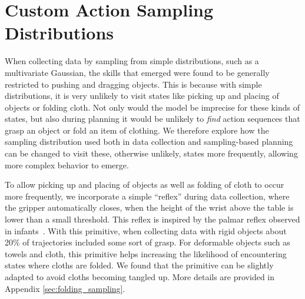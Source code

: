 \section{Custom Action Sampling Distributions}

\label{sec:system}
When collecting data by sampling from simple distributions, such as a multivariate Gaussian, the skills that emerged were found to be generally restricted to pushing and dragging objects. This is because with simple distributions, it is very unlikely to visit states like picking up and placing of objects or folding cloth. Not only would the model be imprecise for these kinds of states, but also during planning it would be unlikely to \emph{find} action sequences that grasp an object or fold an item of clothing.
We therefore explore how the sampling distribution used both in data collection and sampling-based planning can be changed to visit these, otherwise unlikely, states more frequently, allowing more complex behavior to emerge. 

To allow picking up and placing of objects as well as folding of cloth to occur more frequently, we incorporate a simple ``reflex'' during data collection, where the gripper automatically closes, when the height of the wrist above the table is lower than a small threshold. This reflex is inspired by the palmar reflex observed in infants~\cite{grasping_fetal}. With this primitive, when collecting data with rigid objects about 20\% of trajectories included some sort of grasp. For deformable objects such as towels and cloth, this primitive helps increasing the likelihood of encountering states where cloths are folded. We found that the primitive can be slightly adapted to avoid cloths becoming tangled up. More details are provided in Appendix \ref{sec:folding_sampling}.



